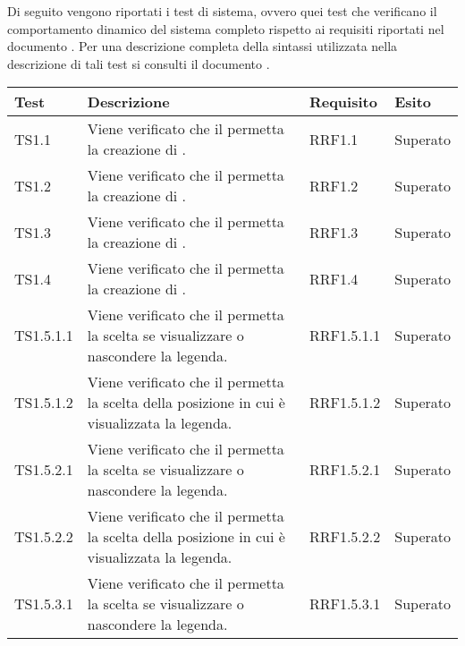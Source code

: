 Di seguito vengono riportati i test di sistema, ovvero quei test che verificano il comportamento dinamico del sistema completo rispetto ai requisiti riportati nel documento . Per una descrizione completa della sintassi utilizzata nella descrizione di tali test si consulti il documento .


\begin{longtabu}{| X[0.5] | X | X[0.5] | X[0.4] |}

			\hline
			\rowfont{\bf}
			Test &
			Descrizione &
			Requisito &
			Esito \\
			\hline \endhead


TS1.1 & Viene verificato che il  permetta la creazione di . & RRF1.1 & Superato\\ \hline

TS1.2 & Viene verificato che il  permetta la creazione di . & RRF1.2 & Superato\\ \hline

TS1.3 & Viene verificato che il  permetta la creazione di . & RRF1.3 & Superato\\ \hline

TS1.4 & Viene verificato che il  permetta la creazione di . & RRF1.4 & Superato\\ \hline

TS1.5.1.1 & Viene verificato che il  permetta la scelta se visualizzare o nascondere la legenda. & RRF1.5.1.1 & Superato\\ \hline

TS1.5.1.2 & Viene verificato che il  permetta la scelta della posizione in cui è visualizzata la legenda. & RRF1.5.1.2 & Superato\\ \hline

TS1.5.2.1 & Viene verificato che il  permetta la scelta se visualizzare o nascondere la legenda. & RRF1.5.2.1 & Superato\\ \hline

TS1.5.2.2 & Viene verificato che il  permetta la scelta della posizione in cui è visualizzata la legenda. & RRF1.5.2.2 & Superato\\ \hline

TS1.5.3.1 & Viene verificato che il  permetta la scelta se visualizzare o nascondere la legenda. & RRF1.5.3.1 & Superato\\ \hline


\end{longtabu}
